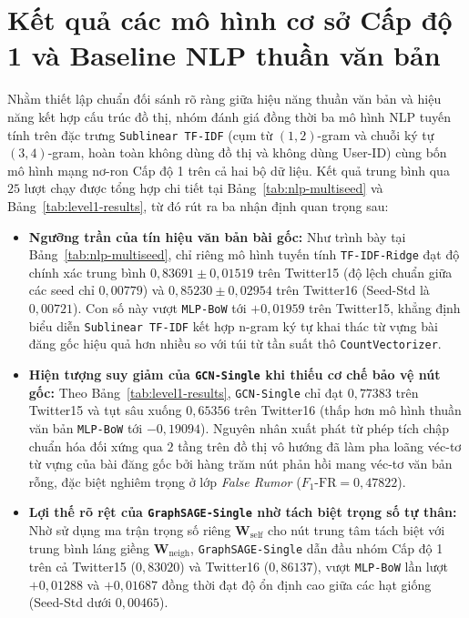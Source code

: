 \documentclass[11pt,a4paper]{extreport}
\begin{document}
\section{Kết quả các mô hình cơ sở Cấp độ 1 và Baseline NLP thuần văn bản}

Nhằm thiết lập chuẩn đối sánh rõ ràng giữa hiệu năng thuần văn bản và hiệu năng kết hợp cấu trúc đồ thị, nhóm đánh giá đồng thời ba mô hình NLP tuyến tính trên đặc trưng \texttt{Sublinear TF-IDF} (cụm từ $(1,2)$-gram và chuỗi ký tự $(3,4)$-gram, hoàn toàn không dùng đồ thị và không dùng User-ID) cùng bốn mô hình mạng nơ-ron Cấp độ 1 trên cả hai bộ dữ liệu. Kết quả trung bình qua $25$ lượt chạy được tổng hợp chi tiết tại Bảng~\ref{tab:nlp-multiseed} và Bảng~\ref{tab:level1-results}, từ đó rút ra ba nhận định quan trọng sau:

\begin{itemize}
    \item \textbf{Ngưỡng trần của tín hiệu văn bản bài gốc:} Như trình bày tại Bảng~\ref{tab:nlp-multiseed}, chỉ riêng mô hình tuyến tính \texttt{TF-IDF-Ridge} đạt độ chính xác trung bình $0{,}83691 \pm 0{,}01519$ trên Twitter15 (độ lệch chuẩn giữa các seed chỉ $0{,}00779$) và $0{,}85230 \pm 0{,}02954$ trên Twitter16 (Seed-Std là $0{,}00721$). Con số này vượt \texttt{MLP-BoW} tới $+0{,}01959$ trên Twitter15, khẳng định biểu diễn \texttt{Sublinear TF-IDF} kết hợp n-gram ký tự khai thác từ vựng bài đăng gốc hiệu quả hơn nhiều so với túi từ tần suất thô \texttt{CountVectorizer}.
    \item \textbf{Hiện tượng suy giảm của \texttt{GCN-Single} khi thiếu cơ chế bảo vệ nút gốc:} Theo Bảng~\ref{tab:level1-results}, \texttt{GCN-Single} chỉ đạt $0{,}77383$ trên Twitter15 và tụt sâu xuống $0{,}65356$ trên Twitter16 (thấp hơn mô hình thuần văn bản \texttt{MLP-BoW} tới $-0{,}19094$). Nguyên nhân xuất phát từ phép tích chập chuẩn hóa đối xứng qua $2$ tầng trên đồ thị vô hướng đã làm pha loãng véc-tơ từ vựng của bài đăng gốc bởi hàng trăm nút phản hồi mang véc-tơ văn bản rỗng, đặc biệt nghiêm trọng ở lớp \textit{False Rumor} ($F_1\text{-FR} = 0{,}47822$).
    \item \textbf{Lợi thế rõ rệt của \texttt{GraphSAGE-Single} nhờ tách biệt trọng số tự thân:} Nhờ sử dụng ma trận trọng số riêng $\mathbf{W}_{\text{self}}$ cho nút trung tâm tách biệt với trung bình láng giềng $\mathbf{W}_{\text{neigh}}$, \texttt{GraphSAGE-Single} dẫn đầu nhóm Cấp độ 1 trên cả Twitter15 ($0{,}83020$) và Twitter16 ($0{,}86137$), vượt \texttt{MLP-BoW} lần lượt $+0{,}01288$ và $+0{,}01687$ đồng thời đạt độ ổn định cao giữa các hạt giống (Seed-Std dưới $0{,}00465$).
\end{itemize}
\end{document}
